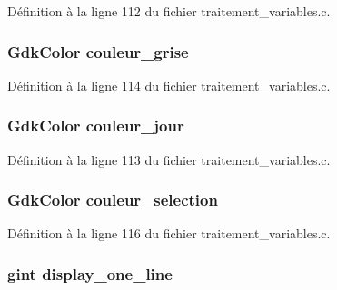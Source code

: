 Définition à la ligne 112 du fichier traitement\_\-variables.c.

\subsubsection[{couleur\_\-grise}]{\setlength{\rightskip}{0pt plus 5cm}GdkColor {\bf couleur\_\-grise}}\label{gsb__file__save_8c_a4119417896b5652f640ead3795baac52}


Définition à la ligne 114 du fichier traitement\_\-variables.c.

\subsubsection[{couleur\_\-jour}]{\setlength{\rightskip}{0pt plus 5cm}GdkColor {\bf couleur\_\-jour}}\label{gsb__file__save_8c_a668e8ab17ed4a22af1464c091c2668c2}


Définition à la ligne 113 du fichier traitement\_\-variables.c.

\subsubsection[{couleur\_\-selection}]{\setlength{\rightskip}{0pt plus 5cm}GdkColor {\bf couleur\_\-selection}}\label{gsb__file__save_8c_a35e437a6db69c9160eeb81674971108b}


Définition à la ligne 116 du fichier traitement\_\-variables.c.

\subsubsection[{display\_\-one\_\-line}]{\setlength{\rightskip}{0pt plus 5cm}gint {\bf display\_\-one\_\-line}}\label{gsb__file__save_8c_a36eb372c7727c89f6ed96a3756a28740}


